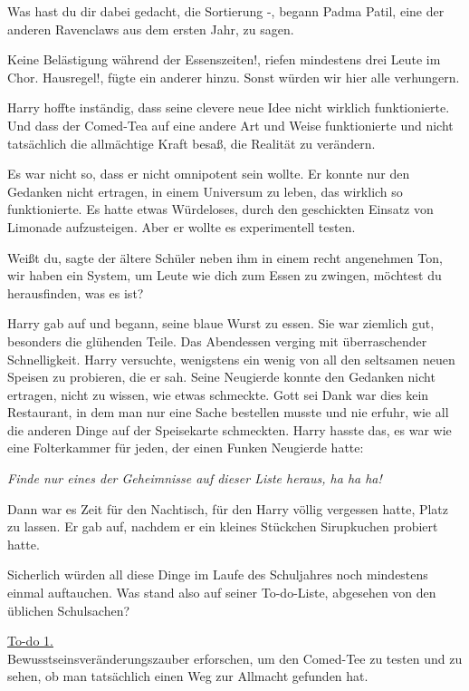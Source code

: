 \glqq Was hast du dir dabei gedacht, die Sortierung -\grqq{}, begann Padma
Patil, eine der anderen Ravenclaws aus dem ersten Jahr, zu sagen.

\glqq Keine Belästigung während der Essenszeiten!\grqq{}, riefen mindestens drei
Leute im Chor. \glqq Hausregel!\grqq{}, fügte ein anderer hinzu. \glqq Sonst
würden wir hier alle verhungern.\grqq{}

Harry hoffte inständig, dass seine clevere neue Idee nicht wirklich
funktionierte. Und dass der Comed-Tea auf eine andere Art und Weise
funktionierte und nicht tatsächlich die allmächtige Kraft besaß, die Realität zu
verändern.

Es war nicht so, dass er nicht omnipotent sein wollte. Er konnte nur den
Gedanken nicht ertragen, in einem Universum zu leben, das wirklich so
funktionierte. Es hatte etwas Würdeloses, durch den geschickten Einsatz von
Limonade aufzusteigen. Aber er wollte es experimentell testen.

\glqq Weißt du\grqq{}, sagte der ältere Schüler neben ihm in einem recht
angenehmen Ton, \glqq wir haben ein System, um Leute wie dich zum Essen zu
zwingen, möchtest du herausfinden, was es ist?\grqq{}

Harry gab auf und begann, seine blaue Wurst zu essen. Sie war ziemlich gut,
besonders die glühenden Teile. Das Abendessen verging mit überraschender
Schnelligkeit. Harry versuchte, wenigstens ein wenig von all den seltsamen neuen
Speisen zu probieren, die er sah. Seine Neugierde konnte den Gedanken nicht
ertragen, nicht zu wissen, wie etwas schmeckte. Gott sei Dank war dies kein
Restaurant, in dem man nur eine Sache bestellen musste und nie erfuhr, wie all
die anderen Dinge auf der Speisekarte schmeckten. Harry hasste das, es war wie
eine Folterkammer für jeden, der einen Funken Neugierde hatte:

\emph{Finde nur eines der Geheimnisse auf dieser Liste heraus, ha ha ha!}

Dann war es Zeit für den Nachtisch, für den Harry völlig vergessen hatte, Platz
zu lassen. Er gab auf, nachdem er ein kleines Stückchen Sirupkuchen probiert
hatte.

Sicherlich würden all diese Dinge im Laufe des Schuljahres noch mindestens
einmal auftauchen. Was stand also auf seiner To-do-Liste, abgesehen von den
üblichen Schulsachen?

\underline{To-do 1.}\\
Bewusstseinsveränderungszauber erforschen, um den Comed-Tee zu testen und zu
sehen, ob man tatsächlich einen Weg zur Allmacht gefunden hat.

